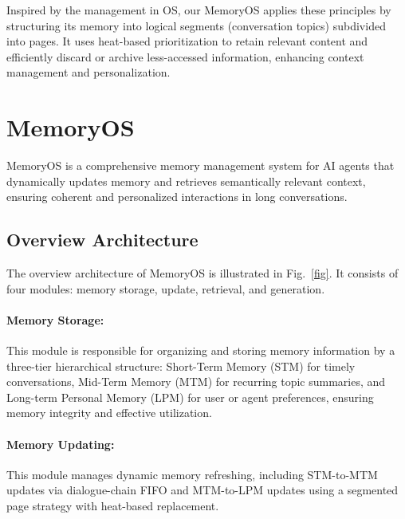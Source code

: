 \documentclass[11pt]{article}
\begin{document}
Inspired by the management in OS, our MemoryOS applies these principles by structuring its memory into logical segments (conversation topics) subdivided into pages. It uses heat-based prioritization to retain relevant content and efficiently discard or archive less-accessed information, enhancing context management and personalization.


\section{MemoryOS}
MemoryOS is a comprehensive memory management system for AI agents that dynamically updates memory and retrieves semantically relevant context, ensuring coherent and personalized interactions in long conversations.

\subsection{Overview Architecture}
The overview architecture of MemoryOS is illustrated in Fig.~\ref{fig}. It consists of four modules: memory storage, update, retrieval, and generation. 



\paragraph{Memory Storage:} This module is responsible for organizing and storing memory information by a three-tier hierarchical structure: Short-Term Memory (STM) for timely conversations, Mid-Term Memory (MTM) for recurring topic summaries, and Long-term Personal Memory (LPM) for user or agent preferences, ensuring memory integrity and effective utilization.
\paragraph{Memory Updating:} This module manages dynamic memory refreshing, including STM-to-MTM updates via dialogue-chain FIFO and MTM-to-LPM updates using a segmented page strategy with heat-based replacement.
\end{document}
